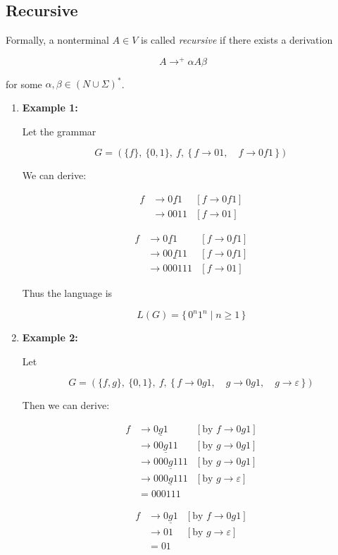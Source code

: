 \documentclass[12pt,a4paper,openany]{article}
\begin{document}
\subsection{Recursive}

Formally, a nonterminal $A \in V$ is called \emph{recursive} if there exists a derivation

\[
A \to^{+} \alpha A \beta
\]

for some $\alpha, \beta \in (N \cup \Sigma)^*$.

\begin{enumerate}
    

\item \textbf{Example 1:}

Let the grammar

\[
G = (\{f\},\ \{0,1\},\ f,\ \{\, f \to 01,\quad f \to 0f1 \,\})
\]

We can derive:

\[
\begin{aligned}
f &\to 0\underline{f}1 & [f \to 0f1] \\
              &\to 0011            & [f \to 01]
\end{aligned}
\]

\[
\begin{aligned}
f &\to 0\underline{f}1 & [f \to 0f1] \\
              &\to 00\underline{f}11 & [f \to 0f1] \\
              &\to 000111            & [f \to 01]
\end{aligned}
\]

Thus the language is

\[\boxed{L(G) = \{\, 0^n 1^n \mid n \ge 1 \,\}}\]


\item  \textbf{Example 2:}

Let

\[
G=(\{f,g\},\ \{0,1\},\ f,\ \{\, f\to 0g1,\quad g\to 0g1,\quad g\to\varepsilon \,\})
\]


Then we can derive:

\noindent
\begin{minipage}[t]{0.48\textwidth}
\[
\begin{aligned}
f &\to 0\underline{g}1 & [\text{by } f\to 0g1] \\
              &\to 0\underline{0g1}1 & [\text{by } g\to 0g1] \\
              &\to 00\underline{0g1}11 & [\text{by } g\to 0g1] \\
              &\to 000\underline{g}111 & [\text{by } g\to\varepsilon] \\
              &= 000111
\end{aligned}
\]
\end{minipage}
\hfill
\begin{minipage}[t]{0.48\textwidth}
\[
\begin{aligned}
f &\to 0\underline{g}1 & [\text{by } f\to 0g1] \\
              &\to 01 & [\text{by } g\to\varepsilon] \\
              &= 01
\end{aligned}
\]
\end{minipage}


\end{enumerate}
\end{document}
